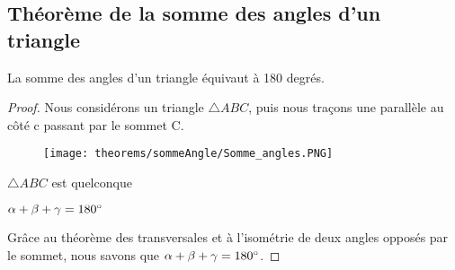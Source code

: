 \documentclass[a4paper,12pt]{article}
\begin{document}
\pagebreak
\subsection{Théorème de la somme des angles d'un triangle}
\begin{theorem}\label{th:180}
La somme des angles d'un triangle équivaut à 180 degrés.
\end{theorem}
\begin{proof}

Nous considérons un triangle $\triangle ABC$, puis nous traçons une parallèle au côté c passant par le sommet C.
\begin{figure}[H]
    \centering
    \texttt{[image: theorems/sommeAngle/Somme\_angles.PNG]}
\end{figure}


\begin{hyp}
$\triangle ABC$ est quelconque
\end{hyp}
\begin{concl}
$\alpha + \beta +\gamma = 180 \degree$
\end{concl}
Grâce au théorème des transversales et à l'isométrie de deux angles opposés par le sommet, nous savons que $\alpha + \beta +\gamma = 180 \degree$.
\end{proof}
\end{document}
